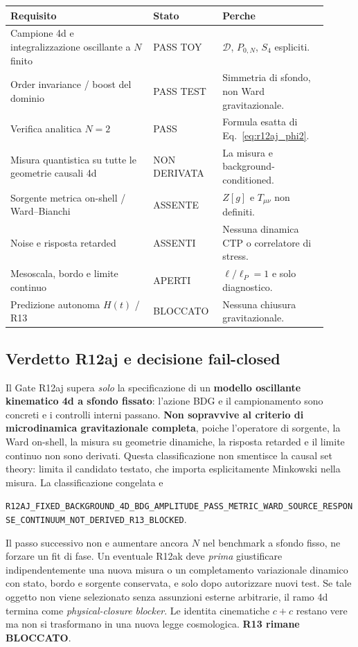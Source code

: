 \documentclass[11pt,a4paper]{article}
\newcommand{\status}[1]{\textsf{#1}}
\begin{document}
\begin{center}
\small
\begin{tabular}{p{0.42\linewidth}p{0.18\linewidth}p{0.31\linewidth}}
\toprule
\textbf{Requisito} & \textbf{Stato} & \textbf{Perche}\tabularnewline\midrule
Campione 4d e integralizzazione oscillante a $N$ finito & \status{PASS TOY} & $\mathcal D$, $P_{0,N}$, $S_4$ espliciti.\\
Order invariance / boost del dominio & \status{PASS TEST} & Simmetria di sfondo, non Ward gravitazionale.\\
Verifica analitica $N=2$ & \status{PASS} & Formula esatta di Eq.~\eqref{eq:r12aj_phi2}.\\
Misura quantistica su tutte le geometrie causali 4d & \status{NON DERIVATA} & La misura e background-conditioned.\\
Sorgente metrica on-shell / Ward--Bianchi & \status{ASSENTE} & $Z[g]$ e $T_{\mu\nu}$ non definiti.\\
Noise e risposta retarded & \status{ASSENTI} & Nessuna dinamica CTP o correlatore di stress.\\
Mesoscala, bordo e limite continuo & \status{APERTI} & $\ell/\ell_P=1$ e solo diagnostico.\\
Predizione autonoma $H(t)$ / R13 & \status{BLOCCATO} & Nessuna chiusura gravitazionale.\\
\bottomrule
\end{tabular}
\end{center}

\subsection{Verdetto R12aj e decisione fail-closed}

Il Gate R12aj supera \emph{solo} la specificazione di un \textbf{modello oscillante kinematico 4d a sfondo fissato}: l'azione BDG e il campionamento sono concreti e i controlli interni passano. \textbf{Non sopravvive al criterio di microdinamica gravitazionale completa}, poiche l'operatore di sorgente, la Ward on-shell, la misura su geometrie dinamiche, la risposta retarded e il limite continuo non sono derivati. Questa classificazione non smentisce la causal set theory: limita il candidato testato, che importa esplicitamente Minkowski nella misura. La classificazione congelata e
\begin{center}\small
\nolinkurl{R12AJ_FIXED_BACKGROUND_4D_BDG_AMPLITUDE_PASS_METRIC_WARD_SOURCE_RESPONSE_CONTINUUM_NOT_DERIVED_R13_BLOCKED}.
\end{center}
Il passo successivo non e aumentare ancora $N$ nel benchmark a sfondo fisso, ne forzare un fit di fase. Un eventuale R12ak deve \emph{prima} giustificare indipendentemente una nuova misura o un completamento variazionale dinamico con stato, bordo e sorgente conservata, e solo dopo autorizzare nuovi test. Se tale oggetto non viene selezionato senza assunzioni esterne arbitrarie, il ramo 4d termina come \emph{physical-closure blocker}. Le identita cinematiche $c+c$ restano vere ma non si trasformano in una nuova legge cosmologica. \textbf{R13 rimane BLOCCATO}.
\end{document}
